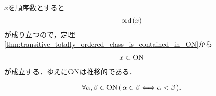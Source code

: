 	\begin{prf} 
		$x$を順序数とすると
		\begin{align}
			\operatorname*{ord}\hspace{0.15em}(x)
		\end{align}
		が成り立つので，定理\ref{thm:transitive_totally_ordered_class_is_contained_in_ON}から
		\begin{align}
			x \subset \mathrm{ON}
		\end{align}
		が成立する．ゆえに$\mathrm{ON}$は推移的である．
		\QED
	\end{prf}
	
	\begin{screen}
		\begin{thm}
		\label{thm:element_and_proper_subset_correspond_between_ordinal_numbers}
			\begin{align}
				\forall \alpha,\beta \in \mathrm{ON}\,
				(\, \alpha \in \beta \Longleftrightarrow \alpha < \beta\, ).
			\end{align}
		\end{thm}
	\end{screen}
	
